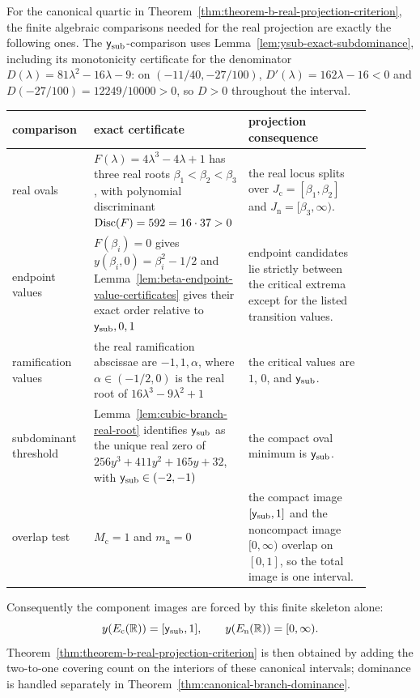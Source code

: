 \begin{lemma}\label{prop:canonical-theorem-b-finite-comparison-skeleton}
For the canonical quartic in Theorem~\ref{thm:theorem-b-real-projection-criterion}, the finite algebraic comparisons needed for the real projection are exactly the following ones.
The \(\mathsf{y}_{\mathrm{sub}}\)-comparison uses Lemma~\ref{lem:ysub-exact-subdominance}, including its monotonicity certificate for the denominator \(D(\lambda)=81\lambda^2-16\lambda-9\): on \((-11/40,-27/100)\), \(D'(\lambda)=162\lambda-16<0\) and \(D(-27/100)=12249/10000>0\), so \(D>0\) throughout the interval.
\begin{center}
\begingroup\small
\begin{tabular}{>{\raggedright\arraybackslash}p{0.22\linewidth} >{\raggedright\arraybackslash}p{0.33\linewidth} >{\raggedright\arraybackslash}p{0.33\linewidth}}
\toprule
comparison & exact certificate & projection consequence\\
\midrule
real ovals & \(F(\lambda)=4\lambda^3-4\lambda+1\) has three real roots \(\beta_1<\beta_2<\beta_3\), with polynomial discriminant \({\rm Disc}(F)=592=16\cdot37>0\) & the real locus splits over \(J_{\mathrm c}=[\beta_1,\beta_2]\) and \(J_{\mathrm n}=[\beta_3,\infty)\).\\[3pt]
endpoint values & \(F(\beta_i)=0\) gives \(y(\beta_i,0)=\beta_i^2-1/2\) and Lemma~\ref{lem:beta-endpoint-value-certificates} gives their exact order relative to \(\mathsf{y}_{\mathrm{sub}},0,1\) & endpoint candidates lie strictly between the critical extrema except for the listed transition values.\\[3pt]
ramification values & the real ramification abscissae are \(-1,1,\alpha\), where \(\alpha\in(-1/2,0)\) is the real root of \(16\lambda^3-9\lambda^2+1\) & the critical values are \(1\), \(0\), and \(\mathsf{y}_{\mathrm{sub}}\).\\[3pt]
subdominant threshold & Lemma~\ref{lem:cubic-branch-real-root} identifies \(\mathsf{y}_{\mathrm{sub}}\) as the unique real zero of \(256y^3+411y^2+165y+32\), with \(\mathsf{y}_{\mathrm{sub}}\in(-2,-1)\) & the compact oval minimum is \(\mathsf{y}_{\mathrm{sub}}\).\\[3pt]
overlap test & \(M_{\mathrm c}=1\) and \(m_{\mathrm n}=0\) & the compact image \([\mathsf{y}_{\mathrm{sub}},1]\) and the noncompact image \([0,\infty)\) overlap on \([0,1]\), so the total image is one interval.\\
\bottomrule
\end{tabular}
\endgroup
\end{center}
Consequently the component images are forced by this finite skeleton alone:
\[
y(E_{\mathrm c}(\mathbb{R}))=[\mathsf{y}_{\mathrm{sub}},1],
\qquad
y(E_{\mathrm n}(\mathbb{R}))=[0,\infty).
\]
Theorem~\ref{thm:theorem-b-real-projection-criterion} is then obtained by adding the two-to-one covering count on the interiors of these canonical intervals; dominance is handled separately in Theorem~\ref{thm:canonical-branch-dominance}.
\end{lemma}

